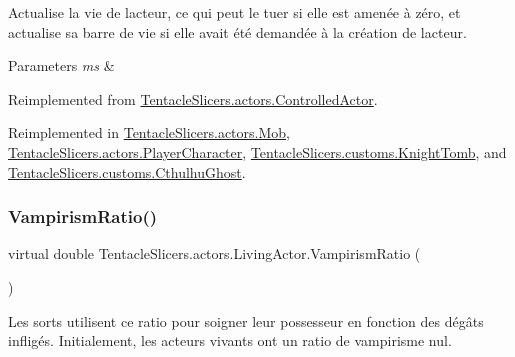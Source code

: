 Actualise la vie de l\textquotesingle{}acteur, ce qui peut le tuer si elle est amenée à zéro, et actualise sa barre de vie si elle avait été demandée à la création de l\textquotesingle{}acteur. 


\begin{DoxyParams}{Parameters}
{\em ms} & \\
\hline
\end{DoxyParams}


Reimplemented from \hyperlink{class_tentacle_slicers_1_1actors_1_1_controlled_actor_aa66cbbda81610ee2610e540e59725a39}{Tentacle\+Slicers.\+actors.\+Controlled\+Actor}.



Reimplemented in \hyperlink{class_tentacle_slicers_1_1actors_1_1_mob_ad3e79cfdf2a28f8eb6363f0567bdcaaf}{Tentacle\+Slicers.\+actors.\+Mob}, \hyperlink{class_tentacle_slicers_1_1actors_1_1_player_character_ae5043ba6bbb1d2007f0f29f61e28369c}{Tentacle\+Slicers.\+actors.\+Player\+Character}, \hyperlink{class_tentacle_slicers_1_1customs_1_1_knight_tomb_a2494934e67c63f70623b7ff47a4248f8}{Tentacle\+Slicers.\+customs.\+Knight\+Tomb}, and \hyperlink{class_tentacle_slicers_1_1customs_1_1_cthulhu_ghost_a402aea79e343f8f5a1b153a143edf9fb}{Tentacle\+Slicers.\+customs.\+Cthulhu\+Ghost}.

\mbox{\label{class_tentacle_slicers_1_1actors_1_1_living_actor_a7a3b86dc36055bcbe1838dd3df0c9274}} 
\subsubsection{\texorpdfstring{Vampirism\+Ratio()}{VampirismRatio()}}
{\footnotesize\ttfamily virtual double Tentacle\+Slicers.\+actors.\+Living\+Actor.\+Vampirism\+Ratio (\begin{DoxyParamCaption}{ }\end{DoxyParamCaption})\hspace{0.3cm}{\ttfamily [virtual]}}



Les sorts utilisent ce ratio pour soigner leur possesseur en fonction des dégâts infligés. Initialement, les acteurs vivants ont un ratio de vampirisme nul. 

